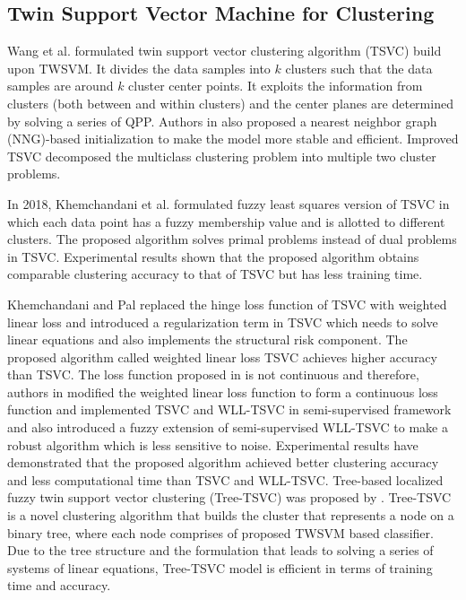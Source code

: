 \documentclass[pdflatex,sn-mathphys]{sn-jnl}%
\theoremstyle{thmstyleone}%
\theoremstyle{thmstyletwo}%
\theoremstyle{thmstylethree}%
\begin{document}
\subsection{Twin Support Vector Machine for Clustering}

Wang et al. \cite{wang2015twin} formulated twin support vector clustering algorithm (TSVC) build upon TWSVM. It divides the data samples into $k$ clusters such that the data samples are around $k$ cluster center points. It exploits the information from clusters (both between and within clusters) and the center planes are determined by solving a series of QPP. Authors in  \cite{wang2015twin} also proposed a nearest neighbor graph (NNG)-based initialization to make the model more stable and efficient. Improved TSVC \cite{moezzi2019twsvc+} decomposed the multiclass clustering problem into multiple two cluster problems.

In 2018, Khemchandani et al. \cite{khemchandani2018fuzzy} formulated fuzzy least squares version of TSVC in which each data point has a fuzzy membership value and is allotted to different clusters. The proposed algorithm solves primal problems instead of dual problems in TSVC. Experimental results shown that the proposed algorithm obtains comparable clustering accuracy to that of TSVC but has less training time.

Khemchandani and Pal \cite{khemchandani2016weighted} replaced the hinge loss function of TSVC with weighted linear loss and introduced a regularization term in TSVC which needs to solve linear equations and also implements the structural risk component. The proposed algorithm called weighted linear loss TSVC achieves higher accuracy than TSVC. The loss function proposed in \cite{khemchandani2016weighted} is not continuous and therefore, authors in \cite{rastogi2019fuzzy} modified the weighted linear loss function to form a continuous loss function and implemented TSVC and WLL-TSVC in semi-supervised framework and also introduced a fuzzy extension of semi-supervised WLL-TSVC to make a robust algorithm which is less sensitive to
noise. Experimental results have demonstrated that the proposed algorithm achieved better clustering accuracy and less computational time than TSVC and WLL-TSVC. Tree-based localized fuzzy twin support vector clustering (Tree-TSVC) was proposed by \cite{poojaclustering}. Tree-TSVC is a novel clustering algorithm that builds the cluster that represents a node on a binary tree, where each node comprises of proposed TWSVM based classifier. Due to the tree structure and the formulation that leads to solving a series of systems of linear equations, Tree-TSVC model is efficient in terms of training time and accuracy. 
\end{document}
